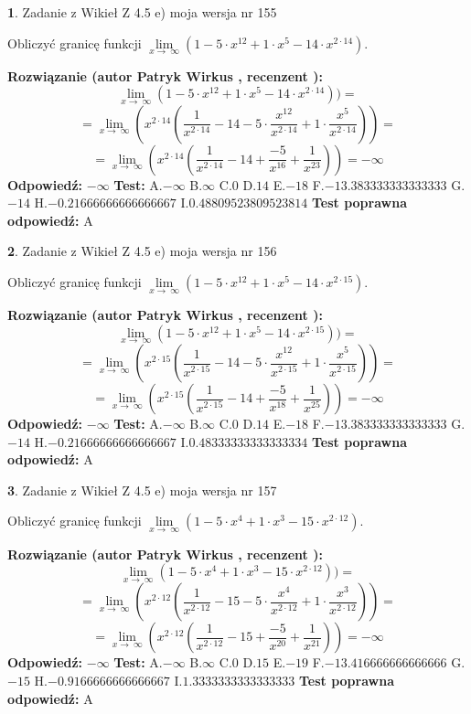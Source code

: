 \documentclass[12pt, a4paper]{article}
\theoremstyle{definition} %
\newtheorem{zad}{}
\newcommand{\zadStart}[1]{\begin{zad}#1\newline}
\newcommand{\zadStop}{\end{zad}}
\newcommand{\rozwStart}[2]{\noindent \textbf{Rozwiązanie (autor #1 , recenzent #2): }\newline}
\newcommand{\rozwStop}{\newline}
\newcommand{\odpStart}{\noindent \textbf{Odpowiedź:}\newline}
\newcommand{\odpStop}{\newline}
\newcommand{\testStart}{\noindent \textbf{Test:}\newline}
\newcommand{\testStop}{\newline}
\newcommand{\kluczStart}{\noindent \textbf{Test poprawna odpowiedź:}\newline}
\newcommand{\kluczStop}{\newline}
\begin{document}
\zadStart{Zadanie z Wikieł Z 4.5 e) moja wersja nr 155}


Obliczyć granicę funkcji  $\lim\limits_{x\to\ \infty}(1 - 5 \cdot x^{12}+1 \cdot x^{5}- 14 \cdot x^{2\cdot14})$.
\zadStop
\rozwStart{Patryk Wirkus}{}
$$\lim\limits_{x\to\ \infty}(1 - 5 \cdot x^{12}+1 \cdot x^{5}- 14 \cdot x^{2\cdot14}))=$$
$$=\lim\limits_{x\to\ \infty}(x^{2\cdot14}(\frac{1}{x^{2\cdot14}}-14 -5 \cdot \frac{x^{12}}{x^{2\cdot14}}+1 \cdot \frac{x^{5}}{x^{2\cdot14}}))=$$
$$=\lim\limits_{x\to\ \infty}(x^{2\cdot14}(\frac{1}{x^{2\cdot14}}-14 + \frac{-5}{x^{16}}+ \frac{1}{x^{23}}))=-\infty$$
\rozwStop
\odpStart
$-\infty$
\odpStop
\testStart
A.$-\infty$ B.$\infty$ C.$0$ D.$14$ E.$-18$
F.$-13.383333333333333$ G.$-14$
H.$-0.21666666666666667$
I.$0.48809523809523814$
\testStop
\kluczStart
A
\kluczStop



\zadStart{Zadanie z Wikieł Z 4.5 e) moja wersja nr 156}


Obliczyć granicę funkcji  $\lim\limits_{x\to\ \infty}(1 - 5 \cdot x^{12}+1 \cdot x^{5}- 14 \cdot x^{2\cdot15})$.
\zadStop
\rozwStart{Patryk Wirkus}{}
$$\lim\limits_{x\to\ \infty}(1 - 5 \cdot x^{12}+1 \cdot x^{5}- 14 \cdot x^{2\cdot15}))=$$
$$=\lim\limits_{x\to\ \infty}(x^{2\cdot15}(\frac{1}{x^{2\cdot15}}-14 -5 \cdot \frac{x^{12}}{x^{2\cdot15}}+1 \cdot \frac{x^{5}}{x^{2\cdot15}}))=$$
$$=\lim\limits_{x\to\ \infty}(x^{2\cdot15}(\frac{1}{x^{2\cdot15}}-14 + \frac{-5}{x^{18}}+ \frac{1}{x^{25}}))=-\infty$$
\rozwStop
\odpStart
$-\infty$
\odpStop
\testStart
A.$-\infty$ B.$\infty$ C.$0$ D.$14$ E.$-18$
F.$-13.383333333333333$ G.$-14$
H.$-0.21666666666666667$
I.$0.48333333333333334$
\testStop
\kluczStart
A
\kluczStop



\zadStart{Zadanie z Wikieł Z 4.5 e) moja wersja nr 157}


Obliczyć granicę funkcji  $\lim\limits_{x\to\ \infty}(1 - 5 \cdot x^{4}+1 \cdot x^{3}- 15 \cdot x^{2\cdot12})$.
\zadStop
\rozwStart{Patryk Wirkus}{}
$$\lim\limits_{x\to\ \infty}(1 - 5 \cdot x^{4}+1 \cdot x^{3}- 15 \cdot x^{2\cdot12}))=$$
$$=\lim\limits_{x\to\ \infty}(x^{2\cdot12}(\frac{1}{x^{2\cdot12}}-15 -5 \cdot \frac{x^{4}}{x^{2\cdot12}}+1 \cdot \frac{x^{3}}{x^{2\cdot12}}))=$$
$$=\lim\limits_{x\to\ \infty}(x^{2\cdot12}(\frac{1}{x^{2\cdot12}}-15 + \frac{-5}{x^{20}}+ \frac{1}{x^{21}}))=-\infty$$
\rozwStop
\odpStart
$-\infty$
\odpStop
\testStart
A.$-\infty$ B.$\infty$ C.$0$ D.$15$ E.$-19$
F.$-13.416666666666666$ G.$-15$
H.$-0.9166666666666667$
I.$1.3333333333333333$
\testStop
\kluczStart
A
\kluczStop
\end{document}
